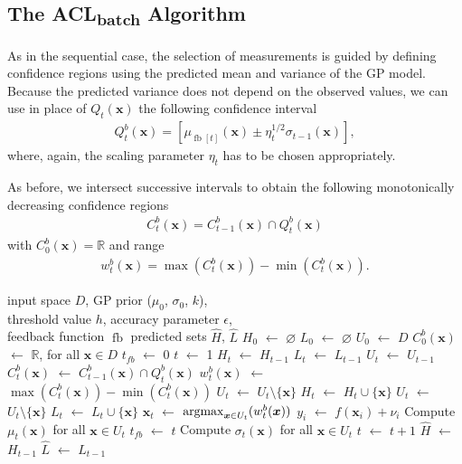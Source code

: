 \documentclass{article}
\def\*#1{\bm{#1}}
\newcommand*\LET[2]{\STATE #1 $\gets$ #2}
\newcommand{\argmax}{\operatornamewithlimits{argmax}}
\newcommand{\bacl}{\textsf{ACL\textsubscript{batch}}\xspace}
\newcommand{\fb}{\mathop{\mathrm{fb}}}
\begin{document}
\subsection{The \bacl Algorithm}
As in the sequential case, the selection of measurements is guided by
defining confidence regions using the predicted mean and variance of
the GP model. Because the predicted variance does not depend on the
observed values, we can use in place of $Q_t(\*x)$ the following
confidence interval
\begin{align*}
Q_t^b(\*x) = \left[\mu_{\fb[t]}(\*x) \pm \eta_t^{1/2}\sigma_{t-1}(\*x)\right],
\end{align*}
where, again, the scaling parameter $\eta_t$ has to be chosen appropriately.

As before, we intersect successive intervals to obtain the following
monotonically decreasing confidence regions
\begin{align*}
C_t^b(\*x) = C_{t-1}^b(\*x) \cap Q_t^b(\*x)
\end{align*}
with $C_0^b(\*x) = \mathbb{R}$ and range
\begin{align*}
w_t^b(\*x) = \max(C_t^b(\*x)) - \min(C_t^b(\*x)).
\end{align*}

\begin{algorithm}[!t]
  \caption{The \bacl algorithm}
  \label{alg:bacl}
\begin{algorithmic}[1]
  \REQUIRE input space $D$, GP prior ($\mu_0$, $\sigma_0$, $k$),\\
           \hspace{1.9em}threshold value $h$, accuracy parameter $\epsilon$,\\
           \hspace{1.9em}feedback function $\fb$
  \ENSURE predicted sets $\hat{H}$, $\hat{L}$
  \LET{$H_0$}{$\varnothing$}
  \LET{$L_0$}{$\varnothing$}
  \LET{$U_0$}{$D$}
  \LET{$C_0^b(\*x)$}{$\mathbb{R}$, for all $\*x \in D$}
  \LET{$t_{fb}$}{0}
  \LET{$t$}{1}
    \LET{$H_t$}{$H_{t-1}$}
    \LET{$L_t$}{$L_{t-1}$}
    \LET{$U_t$}{$U_{t-1}$}
    \FORALL{$\*x \in U_{t-1}$}
      \LET{$C_{t}^{b}(\*x)$}{$C_{t-1}^{b}(\*x) \cap Q_t^{b}(\*x)$}
      \LET{$w_{t}^{b}(\*x)$}{$\max(C_{t}^{b}(\*x)) - \min(C_{t}^{b}(\*x))$}
      \IF{$\min(C_t^{b}(\*x)) + \epsilon \geq h$}
        \LET{$U_t$}{$U_t \setminus \{\*x\}$}
        \LET{$H_t$}{$H_t \cup \{\*x\}$}
      \ELSIF{$\max(C_t^{b}(\*x)) - \epsilon \leq h$}
        \LET{$U_t$}{$U_t \setminus \{\*x\}$}
        \LET{$L_t$}{$L_t \cup \{\*x\}$}
      \ENDIF
    \ENDFOR
    \LET{$\*x_t$}{$\argmax_{\*x \in U_t}(w_t^{b}(\*x))$}
    \IF{$\fb[t+1] > t_{fb}$}
        \LET{$y_i$}{$f(\*x_i) + \nu_i$}
      \ENDFOR
      \STATE Compute $\mu_t(\*x)$ for all $\*x \in U_t$
      \LET{$t_{fb}$}{$t$}
    \ENDIF
    \STATE Compute $\sigma_t(\*x)$ for all $\*x \in U_t$
    \LET{$t$}{$t + 1$}
  \ENDWHILE
  \LET{$\hat{H}$}{$H_{t-1}$}
  \LET{$\hat{L}$}{$L_{t-1}$}
\end{algorithmic}
\end{algorithm}
\end{document}
